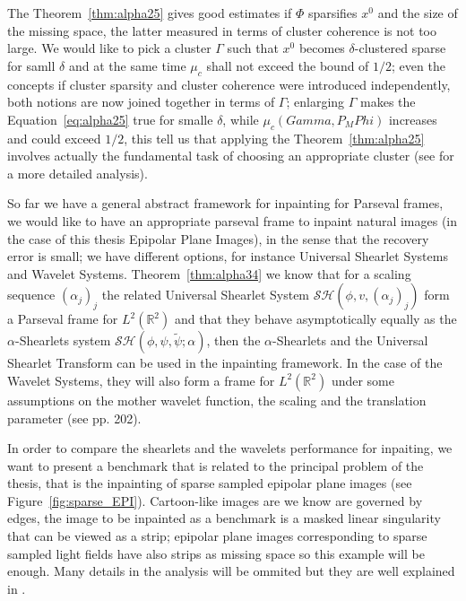 \bigskip

The Theorem~\ref{thm:alpha25} gives good estimates if $\Phi$ sparsifies $x^0$ and the size of the missing space, the latter measured in terms of cluster coherence is not too large. We would like to pick a cluster $\Gamma$ such that $x^0$ becomes $\delta$-clustered sparse for samll $\delta$ and at the same time $\mu_c$ shall not exceed the bound of $1/2$; even the concepts if cluster sparsity and cluster coherence were introduced independently, both notions are now joined together in terms of $\Gamma$; enlarging $\Gamma$ makes the Equation~\ref{eq:alpha25} true for smalle $\delta$, while $\mu_c(Gamma,P_MPhi)$ increases and could exceed $1/2$, this tell us that applying the Theorem~\ref{thm:alpha25} involves actually the fundamental task of choosing an appropriate cluster (see \cite{Firstinpaint} for a more detailed analysis). 

\bigskip

So far we have a general abstract framework for inpainting for Parseval frames, we would like to have an appropriate parseval frame to inpaint natural images (in the case of this thesis Epipolar Plane Images), in the sense that the recovery error is small; we have different options, for instance Universal Shearlet Systems and Wavelet Systems. Theorem~\ref{thm:alpha34} we know that for a scaling sequence $(\alpha_j)_j$ the related Universal Shearlet System $\mathcal{SH}(\phi,v,(\alpha_j)_j)$ form a Parseval frame for $L^2(\mathbb{R}^2)$ and that they behave asymptotically equally as the $\alpha$-Shearlets system $\mathcal{SH}(\phi,\psi,\tilde{\psi};\alpha)$, then the $\alpha$-Shearlets and the Universal Shearlet Transform can be used in the inpainting framework. In the case of the Wavelet Systems, they will also form a frame for $L^2(\mathbb{R}^2)$ under some assumptions on the mother wavelet function, the scaling and the translation parameter (see \cite{Mallat} pp. 202).

\bigskip

In order to compare the shearlets and the wavelets performance for inpaiting, we want to present a benchmark that is related to the principal problem of the thesis, that is the inpainting of sparse sampled epipolar plane images (see Figure~\ref{fig:sparse_EPI}). Cartoon-like images are we know are governed by edges, the image to be inpainted as a benchmark is a masked linear singularity that can be viewed as a strip; epipolar plane images corresponding to sparse sampled light fields have also strips as missing space so this example will be enough. Many details in the analysis will be ommited but they are well explained in \cite{Gitta-alpha}. 

